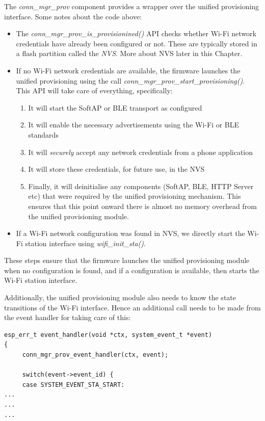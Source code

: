 \documentclass[main.tex]{subfiles}
\begin{document}
The \textit{conn\_mgr\_prov} component provides a wrapper over the unified provisioning interface. Some notes about the code above:
\begin{itemize}
    \item The \textit{conn\_mgr\_prov\_is\_provisionined()} API checks whether Wi-Fi network credentials have already been configured or not. These are typically stored in a flash partition called the \textit{NVS}. More about NVS later in this Chapter.
    \item If no Wi-Fi network credentials are available, the firmware launches the unified provisioning using the call \textit{conn\_mgr\_prov\_start\_provisioning()}. This API will take care of everything, specifically:
    \begin{enumerate}
        \item It will start the SoftAP or BLE transport as configured
        \item It will enable the necessary advertisements using the Wi-Fi or BLE standards
        \item It will \textit{securely} accept any network credentials from a phone application
        \item It will store these credentials, for future use, in the NVS
        \item Finally, it will deinitialise any components (SoftAP, BLE, HTTP Server etc) that were required by the unified provisioning mechanism. This ensures that this point onward there is almost no memory overhead from the unified provisioning module.
    \end{enumerate}
    \item If a Wi-Fi network configuration was found in NVS, we directly start the Wi-Fi station interface using \textit{wifi\_init\_sta()}.
\end{itemize}

These steps ensure that the firmware launches the unified provisioning module when no configuration is found, and if a configuration is available, then starts the Wi-Fi station interface.

Additionally, the unified provisioning module also needs to know the state transitions of the Wi-Fi interface. Hence an additional call needs to be made from the event handler for taking care of this:
\begin{verbatim}
esp_err_t event_handler(void *ctx, system_event_t *event)
{
     conn_mgr_prov_event_handler(ctx, event);
   
     switch(event->event_id) {
     case SYSTEM_EVENT_STA_START:
...
...
...
\end{verbatim}
\end{document}
